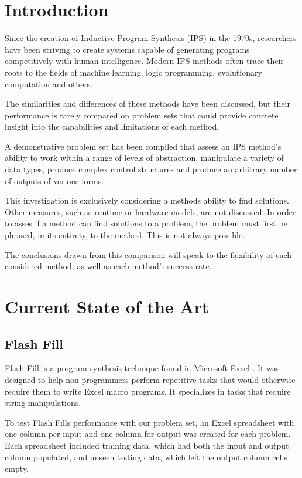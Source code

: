 \section{Introduction}

Since the creation of Inductive Program Synthesis (IPS) in the 1970s\cite{Kitzelmann2009}, researchers have been striving to create systems capable of generating programs competitively with human intelligence. Modern IPS methods often trace their roots to the fields of machine learning, logic programming, evolutionary computation and others.

The similarities and differences of these methods have been discussed\cite{Kitzelmann2009}, but their performance is rarely compared on problem sets that could provide concrete insight into the capabilities and limitations of each method.

A demonstrative problem set has been compiled that assess an IPS method's ability to work within a range of levels of abstraction\cite{Gaunt2016}, manipulate a variety of data types, produce complex control structures and produce an arbitrary number of outputs of various forms\cite{Helmuth2015b}.

This investigation is exclusively considering a methods ability to find solutions. Other measures, such as runtime or hardware models, are not discussed. In order to asses if a method can find solutions to a problem, the problem must first be phrased, in its entirety, to the method. This is not always possible.

The conclusions drawn from this comparison will speak to the flexibility of each considered method, as well as each method's success rate.

\section{Current State of the Art}

\subsection{Flash Fill}

Flash Fill is a program synthesis technique found in Microsoft Excel \cite{Gulwani2011}. It was designed to help non-programmers perform repetitive tasks that would otherwise require them to write Excel macro programs. It specializes in tasks that require string manipulations. 

To test Flash Fills performance with our problem set, an Excel spreadsheet with one column per input and one column for output was created for each problem. Each spreadsheet included training data, which had both the input and output column populated, and unseen testing data, which left the output column cells empty.

